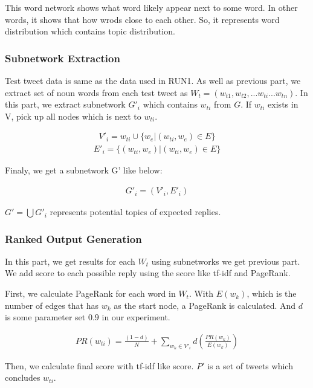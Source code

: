 \documentclass{../style/sig-alternate}
\begin{document}
This word network shows what word likely appear next to some word. In other words, it shows that how wrods close to each other. So, it represents word distribution which contains topic distribution.

\subsubsection{Subnetwork Extraction}
Test tweet data is same as the data used in RUN1. As well as previous part, we extract set of noun words from each test tweet as \(W_{t} = (w_{t1}, w_{t2}, ... w_{ti} ... w_{tn})\).
In this part, we extract subnetwork $G'_{i}$ which contains \(w_{ti}\) from $G$.
If $w_{ti}$ exists in V, pick up all nodes which is next to $w_{ti}$.

\begin{eqnarray}V'_{i} = w_{ti} \cup \{w_{e} |  (w_{ti}, w_{e}) \in E\}\end{eqnarray}
\begin{eqnarray}E'_{i} = \{(w_{ti}, w_{e}) | (w_{ti}, w_{e}) \in E\} \end{eqnarray}

Finaly, we get a subnetwork G' like below:

\begin{eqnarray}G'_{i} = (V'_{i}, E'_{i})\end{eqnarray}

\(G' = \bigcup G'_{i}\) represents potential topics of expected replies.

\subsubsection{Ranked Output Generation}
In this part, we get results for each $W_{t}$ using subnetworks we get previous part. We add score to each possible reply using the score like tf-idf and PageRank\cite{PageRank}.

First, we calculate PageRank for each word in $W_{t}$. With $E(w_{k})$, which is the number of edges that has $w_{k}$ as the start node, a PageRank is calculated. And $d$ is some parameter set $0.9$ in our experiment.

\begin{eqnarray}PR(w_{ti}) = \frac{(1-d)}{N} + \sum_{w_{k}\in V'_{i}} d(\frac{PR(w_{k})}{E(w_{k})})\end{eqnarray}

Then, we calculate final score with tf-idf like score. $P'$ is a set of tweets which concludes $w_{ti}$. 
\end{document}
